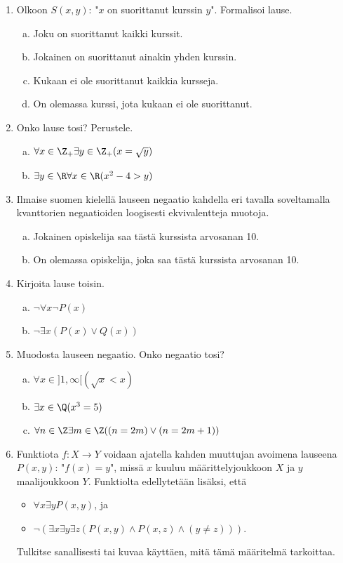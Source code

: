 \begin{enumerate}
\item Olkoon $S(x,y)$: "$x$ on suorittanut kurssin $y$".
Formalisoi lause.
\begin{enumerate}[a)]
\item Joku on suorittanut kaikki kurssit.
\item Jokainen on suorittanut ainakin yhden kurssin.
\item Kukaan ei ole suorittanut kaikkia kursseja.
\item On olemassa kurssi, jota kukaan ei ole suorittanut.
\end{enumerate}

\item Onko lause tosi? Perustele.
\begin{enumerate}[a)]
\item $\forall x\in \Z_{+} \exists y\in \Z_{+} (x = \sqrt{y})
$
\item $\exists y\in \R \forall x\in \R (x^2 - 4 > y)$
\end{enumerate}

\item Ilmaise suomen kielellä lauseen negaatio kahdella eri
tavalla soveltamalla kvanttorien negaatioiden loogisesti
ekvivalentteja muotoja.
\begin{enumerate}[a)]
\item Jokainen opiskelija saa tästä kurssista arvosanan 10.
\item On olemassa opiskelija, joka saa tästä kurssista
arvosanan 10.
\end{enumerate}

\item Kirjoita lause toisin.
\begin{enumerate}[a)]
\item $\lnot \forall x \lnot P(x)$
\item $\lnot \exists x (P(x) \lor Q(x))$
\end{enumerate}

\item
Muodosta lauseen negaatio. Onko negaatio tosi?
\begin{enumerate}[a)]
\item $\forall x\in ]1, \infty [ (\sqrt{x} < x)$
\item $\exists x\in \Q (x^3 = 5)$
\item $\forall n \in \Z \exists m \in \Z ((n = 2m) \lor (n =
2m+1))$
\end{enumerate}

\item Funktiota $f\colon X\to Y$ voidaan ajatella kahden
muuttujan avoimena lauseena $P(x,y)$: "$f(x) = y$", missä
$x$ kuuluu määrittelyjoukkoon $X$ ja $y$ maalijoukkoon $Y$.
Funktiolta edellytetään lisäksi, että
\begin{itemize}
\item $\forall x \exists y P(x,y)$, ja
\item $\lnot (\exists x \exists y \exists z (P(x,y) \land P(x,z)
\land (y \neq z)))$.
\end{itemize}
Tulkitse sanallisesti tai kuvaa käyttäen, mitä tämä määritelmä
tarkoittaa.


\end{enumerate}
